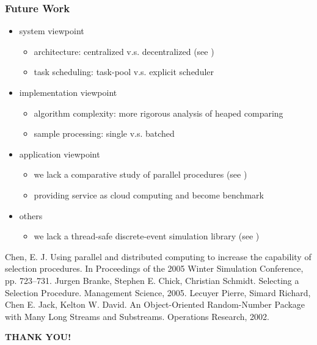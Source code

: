 \documentclass{beamer}
\begin{document}
\begin{frame}
\frametitle{Future Work}
\begin{itemize}
\item system viewpoint
\begin{itemize}
\item architecture: centralized v.s. decentralized (see \cite{potwsc05ras})
\item task scheduling: task-pool v.s. explicit scheduler
\end{itemize}
\item implementation viewpoint
\begin{itemize}
\item algorithm complexity: more rigorous analysis of heaped comparing
\item sample processing: single v.s. batched
\end{itemize}
\item application viewpoint
\begin{itemize}
\item we lack a comparative study of parallel procedures (see \cite{ms05ras})
\item providing service as cloud computing and become benchmark
\end{itemize}
\item others
\begin{itemize}
\item we lack a thread-safe discrete-event simulation library (see \cite{ssj})
\end{itemize}
\end{itemize}
\tiny
{
\begin{thebibliography}{10}
 Chen, E. J. Using parallel and distributed computing to increase the capability of selection procedures. In Proceedings of the 2005 Winter Simulation Conference, pp. 723–731.
 Jurgen Branke, Stephen E. Chick, Christian Schmidt. Selecting a Selection Procedure. Management Science, 2005.
 Lecuyer Pierre, Simard Richard, Chen E. Jack, Kelton W. David. An Object-Oriented Random-Number Package with Many Long Streams and Substreams. Operations Research, 2002.
\end{thebibliography}
}
\end{frame}

\begin{frame}
\begin{center}
\Huge \bf \color{blue} THANK YOU!
\end{center}
\end{frame}
\end{document}
